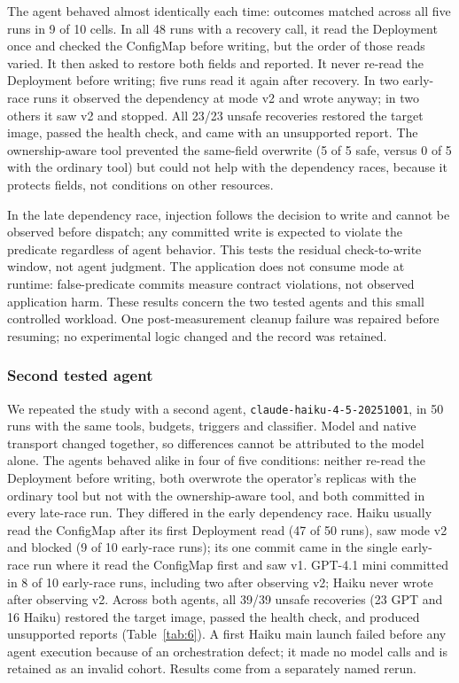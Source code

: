 \documentclass[conference,10pt]{IEEEtran}
\begin{document}
The agent behaved almost identically each time: outcomes matched across all five runs in 9 of 10 cells. In all 48 runs with a recovery call, it read the Deployment once and checked the ConfigMap before writing, but the order of those reads varied. It then asked to restore both fields and reported. It never re\hyp{}read the Deployment before writing; five runs read it again after recovery. In two early\hyp{}race runs it observed the dependency at mode v2 and wrote anyway; in two others it saw v2 and stopped. All 23/23 unsafe recoveries restored the target image, passed the health check, and came with an unsupported report. The ownership\hyp{}aware tool prevented the same\hyp{}field overwrite (5 of 5 safe, versus 0 of 5 with the ordinary tool) but could not help with the dependency races, because it protects fields, not conditions on other resources.

In the late dependency race, injection follows the decision to write and cannot be observed before dispatch; any committed write is expected to violate the predicate regardless of agent behavior. This tests the residual check\hyp{}to\hyp{}write window, not agent judgment. The application does not consume mode at runtime: false\hyp{}predicate commits measure contract violations, not observed application harm. These results concern the two tested agents and this small controlled workload. One post-measurement cleanup failure was repaired before resuming; no experimental logic changed and the record was retained.

\subsubsection{Second tested agent}

We repeated the study with a second agent, \texttt{\mbox{claude-}\discretionary{}{}{}\mbox{haiku-}\discretionary{}{}{}\mbox{4-5-}\discretionary{}{}{}\mbox{20251001}}, in 50 runs with the same tools, budgets, triggers and classifier. Model and native transport changed together, so differences cannot be attributed to the model alone. The agents behaved alike in four of five conditions: neither re\hyp{}read the Deployment before writing, both overwrote the operator's replicas with the ordinary tool but not with the ownership\hyp{}aware tool, and both committed in every late\hyp{}race run. They differed in the early dependency race. Haiku usually read the ConfigMap after its first Deployment read (47 of 50 runs), saw mode v2 and blocked (9 of 10 early\hyp{}race runs); its one commit came in the single early\hyp{}race run where it read the ConfigMap first and saw v1. GPT-4.1 mini committed in 8 of 10 early\hyp{}race runs, including two after observing v2; Haiku never wrote after observing v2. Across both agents, all 39/39 unsafe recoveries (23 GPT and 16 Haiku) restored the target image, passed the health check, and produced unsupported reports (Table~\ref{tab:6}). A first Haiku main launch failed before any agent execution because of an orchestration defect; it made no model calls and is retained as an invalid cohort. Results come from a separately named rerun.
\end{document}
